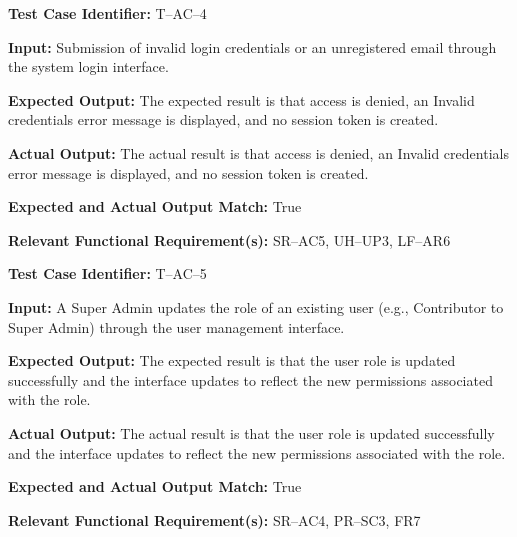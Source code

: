 \documentclass[12pt, titlepage]{article}
\begin{document}
\begin{mdframed}[linewidth=0.5mm]
\setlength{\parindent}{0pt}
\textbf{Test Case Identifier:} T--AC--4
\vspace{0.4em}

\textbf{Input:} Submission of invalid login credentials or an unregistered email through the system login interface.
\vspace{0.4em}

\textbf{Expected Output:} The expected result is that access is denied, an Invalid credentials error message is displayed, and no session token is created.
\vspace{0.4em}

\textbf{Actual Output:} The actual result is that access is denied, an Invalid credentials error message is displayed, and no session token is created.
\vspace{0.4em}

\textbf{Expected and Actual Output Match:} True
\vspace{0.4em}

\textbf{Relevant Functional Requirement(s):} SR--AC5, UH--UP3, LF--AR6
\end{mdframed}

\begin{mdframed}[linewidth=0.5mm]
\setlength{\parindent}{0pt}
\textbf{Test Case Identifier:} T--AC--5
\vspace{0.4em}

\textbf{Input:} A Super Admin updates the role of an existing user (e.g., Contributor to Super Admin) through the user management interface.
\vspace{0.4em}

\textbf{Expected Output:} The expected result is that the user role is updated successfully and the interface updates to reflect the new permissions associated with the role.
\vspace{0.4em}

\textbf{Actual Output:} The actual result is that the user role is updated successfully and the interface updates to reflect the new permissions associated with the role.
\vspace{0.4em}

\textbf{Expected and Actual Output Match:} True
\vspace{0.4em}

\textbf{Relevant Functional Requirement(s):} SR--AC4, PR--SC3, FR7
\end{mdframed}
\end{document}
